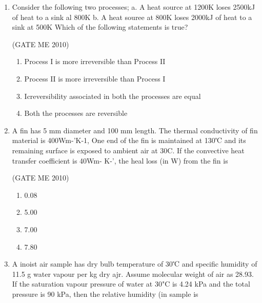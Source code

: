 \documentclass[journal,12pt,onecolumn]{IEEEtran}
\theoremstyle{remark}
\begin{document}
\begin{enumerate}
\hfill{(GATE  ME 2010)}


\begin{multicols}{4}
\begin{enumerate}
\item 29.7
\item 19.9
\item 13.3
\item 0
\end{enumerate}
\end{multicols}


\item Consider the following two processes;
a. A heat source at 1200K loses 2500kJ of heat to a sink al 800K
b. A heat souree at 800K loses 2000kJ of heat to a sink at 500K
Which of the following statements is true?

\hfill{(GATE  ME 2010)}

 
\begin{enumerate}
\item Process I is more irreversible than Process II
\item Process II is more irreversible than Process I
\item Icreversibility associated in both the processes are equal
\item Both the processes are reversible
\end{enumerate}
 


\item A fin has 5 mm diameter and 100 mm length. The thermal conductivity of fin material is
400Wm-'K-1, One end of the fin is maintained at 130℃ and its remaining surface is exposed to
ambient air at 30C. If the convective heat transfer coefficient is 40Wm- K-', the heal loss
(in W) from the fin is

\hfill{(GATE  ME 2010)}


\begin{multicols}{4}
\begin{enumerate}
\item 0.08
\item 5.00
\item 7.00
\item 7.80
\end{enumerate}
\end{multicols}

\item A inoist air sample has dry bulb temperature of 30℃ and specific humidity of 11.5 g water vapour per kg dry ajr. Assume molecular weight of air as 28.93. If the saturation vapour pressure of water at 30"C is 4.24 kPa and the total pressure is 90 kPa, then the relative humidity (in %
sample is



\end{enumerate}
\end{document}
